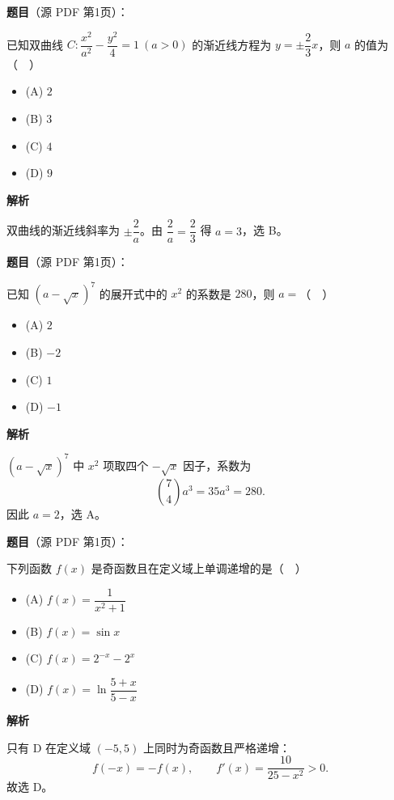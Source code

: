 \begin{answer}

\textbf{题目}（源 PDF 第1页）：

已知双曲线 \(C:\dfrac{x^2}{a^2}-\dfrac{y^2}{4}=1\ (a>0)\) 的渐近线方程为 \(y=\pm\dfrac{2}{3}x\)，则 \(a\) 的值为（　）

\begin{itemize}
\item (A) \(2\)
\item (B) \(3\)
\item (C) \(4\)
\item (D) \(9\)
\end{itemize}

\textbf{解析}

双曲线的渐近线斜率为 \(\pm\dfrac{2}{a}\)。由 \(\dfrac2a=\dfrac23\) 得 \(a=3\)，选 B。


\end{answer}
\begin{answer}

\textbf{题目}（源 PDF 第1页）：

已知 \((a-\sqrt{x})^7\) 的展开式中的 \(x^2\) 的系数是 \(280\)，则 \(a=\)（　）

\begin{itemize}
\item (A) \(2\)
\item (B) \(-2\)
\item (C) \(1\)
\item (D) \(-1\)
\end{itemize}

\textbf{解析}

\((a-\sqrt{x})^7\) 中 \(x^2\) 项取四个 \(-\sqrt{x}\) 因子，系数为
\nopagebreak[4]
\[
\binom74a^3=35a^3=280.
\]
因此 \(a=2\)，选 A。


\end{answer}
\begin{answer}

\textbf{题目}（源 PDF 第1页）：

下列函数 \(f(x)\) 是奇函数且在定义域上单调递增的是（　）

\begin{itemize}
\item (A) \(f(x)=\dfrac{1}{x^2+1}\)
\item (B) \(f(x)=\sin x\)
\item (C) \(f(x)=2^{-x}-2^x\)
\item (D) \(f(x)=\ln\dfrac{5+x}{5-x}\)
\end{itemize}

\textbf{解析}

只有 D 在定义域 \((-5,5)\) 上同时为奇函数且严格递增：
\nopagebreak[4]
\[
f(-x)=-f(x),\qquad f'(x)=\frac{10}{25-x^2}>0.
\]
故选 D。


\end{answer}
